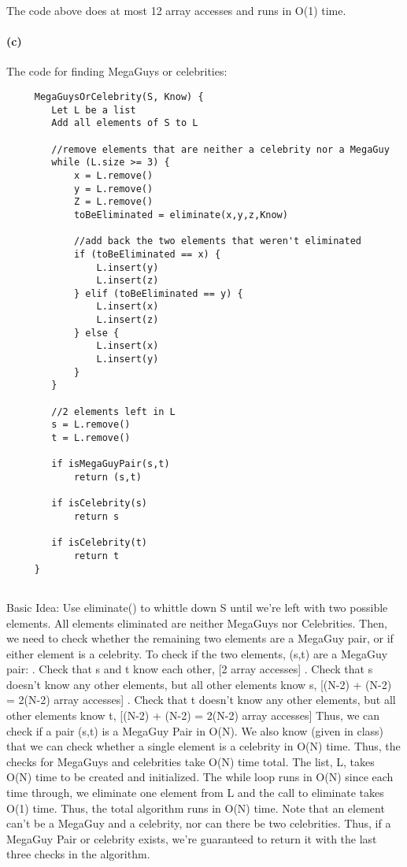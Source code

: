 \documentclass[11pt,a4paper]{article}
\begin{document}
	 The code above does at most 12 array accesses and runs in O(1) time.
	 
	 \paragraph{(c)}
	 
	 The code for finding MegaGuys or celebrities: \newline
	 \begin{lstlisting}
	 MegaGuysOrCelebrity(S, Know) {
	 	Let L be a list
	 	Add all elements of S to L
	 	
	 	//remove elements that are neither a celebrity nor a MegaGuy
	 	while (L.size >= 3) {
	 		x = L.remove()
	 		y = L.remove()
	 		Z = L.remove()
	 		toBeEliminated = eliminate(x,y,z,Know)
	 		
	 		//add back the two elements that weren't eliminated
	 		if (toBeEliminated == x) {
	 			L.insert(y)
	 			L.insert(z)
	 		} elif (toBeEliminated == y) {
	 			L.insert(x)
	 			L.insert(z)
	 		} else {
	 			L.insert(x)
	 			L.insert(y)
	 		}
	 	}
	 	
	 	//2 elements left in L
	 	s = L.remove()
	 	t = L.remove()

	 	if isMegaGuyPair(s,t) 
	 		return (s,t)
	 	
	 	if isCelebrity(s)
	 		return s
	 	
	 	if isCelebrity(t)
	 		return t
	 }
	 	
	 \end{lstlisting}
	 
	 Basic Idea: Use eliminate() to whittle down S until we're left with two possible elements. All elements eliminated are neither MegaGuys nor Celebrities. Then, we need to check whether the remaining two elements are a MegaGuy pair, or if either element is a celebrity. \newline
	  To check if the two elements, (s,t) are a MegaGuy pair: . Check that s and t know each other, [2 array accesses] . Check that s doesn't know any other elements, but all other elements know s, [(N-2) + (N-2) = 2(N-2) array accesses] . Check that t doesn't know any other elements, but all other elements know t, [(N-2) + (N-2) = 2(N-2) array accesses] \newline
	  Thus, we can check if a pair (s,t) is a MegaGuy Pair in O(N). We also know (given in class) that we can check whether a single element is a celebrity in O(N) time. Thus, the checks for MegaGuys and celebrities take O(N) time total. The list, L, takes O(N) time to be created and initialized. The while loop runs in O(N) since each time through, we eliminate one element from L and the call to eliminate takes O(1) time. Thus, the total algorithm runs in O(N) time. \newline
	  Note that an element can't be a MegaGuy and a celebrity, nor can there be two celebrities. Thus, if a MegaGuy Pair or celebrity exists, we're guaranteed to return it with the last three checks in the algorithm.
	
\end{document}
